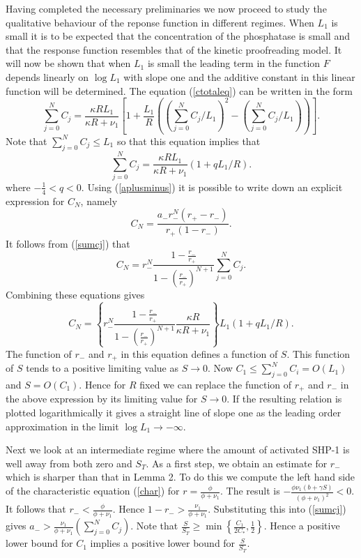 \documentclass{article}
\begin{document}
Having completed the necessary preliminaries we now proceed to study the 
qualitative behaviour of the reponse function in different regimes. When $L_1$ 
is small it is to be expected that the concentration of the 
phosphatase is small and that the response function resembles that of the 
kinetic proofreading model. It will now be shown that when $L_1$ is small
the leading term in the function $F$ depends linearly on $\log L_1$ with slope 
one and the additive constant in this linear function will be determined. The 
equation (\ref{ctotaleq}) can be written in the form
\begin{equation}
\sum_{j=0}^NC_j=\frac{\kappa RL_1}{\kappa R+\nu_1}\left[1+
\frac{L_1}{R}\left((\sum_{j=0}^NC_j/L_1)^2
-(\sum_{j=0}^N  C_j/L_1)\right)\right].
\end{equation}
Note that $\sum_{j=0}^N  C_j\le L_1$ so that this equation implies that
\begin{equation}\label{sumleading}
\sum_{j=0}^NC_j=\frac{\kappa RL_1}{\kappa R+\nu_1}(1+qL_1/R).
\end{equation}
where $-\frac14<q<0$. Using (\ref{aplusminus}) it is possible to write down an 
explicit expression for $C_N$, namely
\begin{equation}
C_N=\frac{a_-r_-^N(r_+-r_-)}{r_+(1-r_-)}.
\end{equation}
It follows from (\ref{sumcj}) that
\begin{equation}
C_N=r_-^N\frac{1-\frac{r_-}{r_+}}{1-(\frac{r_-}{r_+})^{N+1}}\sum_{j=0}^N C_j.
\end{equation}
Combining these equations gives
\begin{equation}
C_N=\left\{
r_-^N\frac{1-\frac{r_-}{r_+}}{1-(\frac{r_-}{r_+})^{N+1}}
\frac{\kappa R}{\kappa R+\nu_1}\right\}L_1(1+qL_1/R).
\end{equation}
The function of $r_-$ and $r_+$ in this equation defines a function of $S$.
This function of $S$ tends to a positive limiting value as $S\to 0$. Now
$C_1\le\sum_{j=0}^N C_i=O(L_1)$ and $S=O(C_1)$. Hence for $R$ fixed we can 
replace the function of $r_+$ and $r_-$ in the above expression by its 
limiting value for $S\to 0$. If the resulting relation is plotted 
logarithmically it gives a straight line of slope one as the leading order 
approximation in the limit $\log L_1\to -\infty$.

Next we look at an intermediate regime where the amount of activated SHP-1 
is well away from both zero and $S_T$. As a first step, we obtain an estimate 
for $r_-$ which is sharper than that in Lemma 2. To do this we compute the 
left hand side of the characteristic equation (\ref{char}) for 
$r=\frac{\phi}{\phi+\nu_1}$. The result is 
$-\frac{\phi\nu_1(b+\gamma S)}{(\phi+\nu_1)^2}<0$. It follows that 
$r_-<\frac{\phi}{\phi+\nu_1}$. Hence $1-r_->\frac{\nu_1}{\phi+\nu_1}$. 
Substituting this into (\ref{sumcj}) gives 
$a_->\frac{\nu_1}{\phi+\nu_1}\left(\sum_{j=0}^NC_j\right)$. Note that
$\frac{S}{S_T}\ge\min\left\{\frac{C_1}{2C_*},\frac12\right\}$. Hence a positive
lower bound for $C_1$ implies a positive lower bound for $\frac{S}{S_T}$.
\end{document}
